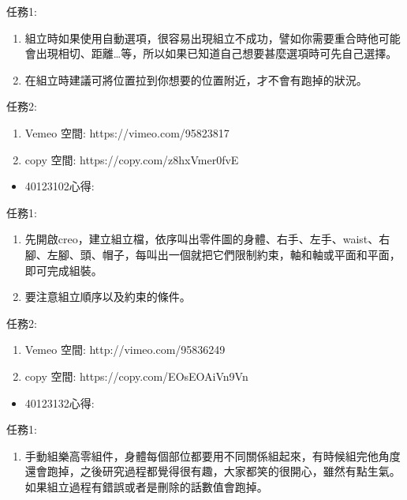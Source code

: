 \documentclass[]{article}
\begin{document}
任務1:

\begin{enumerate}
\def\labelenumi{\arabic{enumi}.}
\item
  組立時如果使用自動選項，很容易出現組立不成功，譬如你需要重合時他可能會出現相切、距離\ldots{}等，所以如果已知道自己想要甚麼選項時可先自己選擇。
\item
  在組立時建議可將位置拉到你想要的位置附近，才不會有跑掉的狀況。
\end{enumerate}

任務2:

\begin{enumerate}
\def\labelenumi{\arabic{enumi}.}
\item
  Vemeo 空間: https://vimeo.com/95823817
\item
  copy 空間: https://copy.com/z8hxVmer0fvE
\end{enumerate}

\begin{itemize}
\itemsep1pt\parskip0pt
\item
  40123102心得:
\end{itemize}

任務1:

\begin{enumerate}
\def\labelenumi{\arabic{enumi}.}
\item
  先開啟creo，建立組立檔，依序叫出零件圖的身體、右手、左手、waist、右腳、左腳、頭、帽子，每叫出一個就把它們限制約束，軸和軸或平面和平面，即可完成組裝。
\item
  要注意組立順序以及約束的條件。
\end{enumerate}

任務2:

\begin{enumerate}
\def\labelenumi{\arabic{enumi}.}
\item
  Vemeo 空間: http://vimeo.com/95836249
\item
  copy 空間: https://copy.com/EOsEOAiVn9Vn
\end{enumerate}

\begin{itemize}
\itemsep1pt\parskip0pt
\item
  40123132心得:
\end{itemize}

任務1:

\begin{enumerate}
\def\labelenumi{\arabic{enumi}.}
\itemsep1pt\parskip0pt
\item
  手動組樂高零組件，身體每個部位都要用不同關係組起來，有時候組完他角度還會跑掉，之後研究過程都覺得很有趣，大家都笑的很開心，雖然有點生氣。如果組立過程有錯誤或者是刪除的話數值會跑掉。
\end{enumerate}
\end{document}
